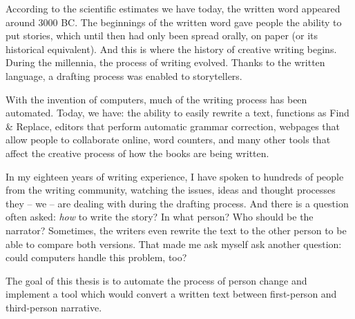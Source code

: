 According to the scientific estimates we have today, the written word appeared around 3000 BC. The beginnings of the written word gave people the ability to put stories, which until then had only been spread orally, on paper (or its historical equivalent). And this is where the history of creative writing begins. During the millennia, the process of writing evolved. Thanks to the written language, a drafting process was enabled to storytellers.

With the invention of computers, much of the writing process has been automated. Today, we have: the ability to easily rewrite a text, functions as Find \& Replace, editors that perform automatic grammar correction, webpages that allow people to collaborate online, word counters, and many other tools that affect the creative process of how the books are being written.

In my eighteen years of writing experience, I have spoken to hundreds of people from the writing community, watching the issues, ideas and thought processes they -- we -- are dealing with during the drafting process. And there is a question often asked: \emph{how} to write the story? In what person? Who should be the narrator? Sometimes, the writers even rewrite the text to the other person to be able to compare both versions. That made me ask myself ask another question: could computers handle this problem, too?

The goal of this thesis is to automate the process of person change and implement a tool which would convert a written text between first-person and third-person narrative. 




